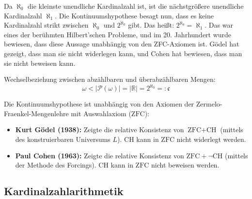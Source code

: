 \begin{spoken-clean}[01:05:20 - 01:07:21]
Da $\aleph_0$ die kleinste unendliche Kardinalzahl ist, ist die nächstgrößere unendliche Kardinalzahl $\aleph_1$. Die Kontinuumshypothese besagt nun, dass es keine Kardinalzahl strikt zwischen $\aleph_0$ und $2^{\aleph_0}$ gibt. Das heißt: $2^{\aleph_0} = \aleph_1$. Das war eines der berühmten Hilbert'schen Probleme, und im 20. Jahrhundert wurde bewiesen, dass diese Aussage unabhängig von den ZFC-Axiomen ist. Gödel hat gezeigt, dass man sie nicht widerlegen kann, und Cohen hat bewiesen, dass man sie nicht beweisen kann.
\end{spoken-clean}

\begin{math-stroke}
Wechselbeziehung zwischen abzählbaren und überabzählbaren Mengen:
\[
\omega < |\mathcal{P}(\omega)| = |\mathbb{R}| = 2^{\aleph_0} =: \mathfrak{c}
\]


\begin{explanation-of-steps}
Die Kontinuumshypothese ist unabhängig von den Axiomen der Zermelo-Fraenkel-Mengenlehre mit Auswahlaxiom ($\text{ZFC}$):
\begin{itemize}
    \item \textbf{Kurt Gödel (1938):} Zeigte die relative Konsistenz von $\text{ZFC} + \text{CH}$ (mittels des konstruierbaren Universums $L$). $\text{CH}$ kann in $\text{ZFC}$ nicht widerlegt werden.
    \item \textbf{Paul Cohen (1963):} Zeigte die relative Konsistenz von $\text{ZFC} + \neg\text{CH}$ (mittels der Methode des Forcings). $\text{CH}$ kann in $\text{ZFC}$ nicht beweisen werden.
\end{itemize}
\end{explanation-of-steps}
\end{math-stroke}

\subsection{Kardinalzahlarithmetik}

